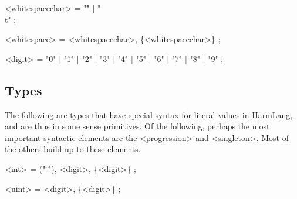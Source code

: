 \documentclass{article}
\begin{document}
\begin{grammar}

<whitespacechar> = "\" \"" | "\"\\t\"" ;

<whitespace> = <whitespacechar>, \{<whitespacechar>\} ;




<digit> = "\"0\"" | "\"1\"" | "\"2\"" | "\"3\"" | "\"4\"" | "\"5\"" | "\"6\"" | "\"7\"" | "\"8\"" | "\"9\"" ;




\end{grammar}

\subsection{Types}

The following are types that have special syntax for literal values in HarmLang, and are thus in some sense primitives.  Of the following, perhaps the most important syntactic elements are the <progression> and <singleton>.  Most of the others build up to these elements.

\begin{grammar}

<int> = ("\"-\""), <digit>, \{<digit>\} ;

<uint> = <digit>, \{<digit>\} ;








\end{grammar}
\end{document}
